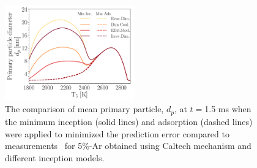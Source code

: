 
\begin{figure}[H]
	\centering
	\includegraphics[width=0.5\textwidth]{Figures/Results/Shocktube/Agafonov2016_cpr/d_p_maxincads_combined.pdf}
	\caption{The comparison of mean primary particle, $d_p$, at $t=$1.5 ms when the minimum inception (solid lines) and adsorption (dashed lines) were applied to minimized the prediction error compared to measurements~\citep{agafonov2016unified} for 5\%-Ar obtained using Caltech mechanism and different inception models.}
	\label{fig:shockagof_dp_maxincads_cpr} 
\end{figure}


